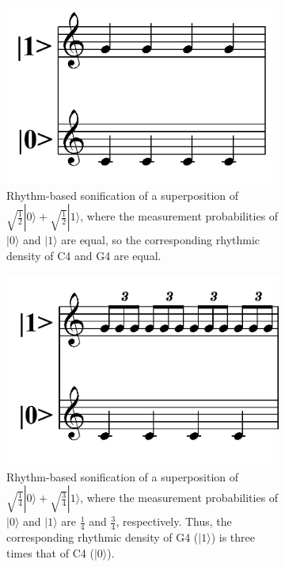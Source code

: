 \documentclass[10pt,twocolumn]{article}
\begin{document}
\begin{figure}[h]

        \begin{subfigure}{0.45\textwidth}
                \centering
                \includegraphics[width=\textwidth]{fig/Figure 1a.png} %
                \caption{Rhythm-based sonification of a superposition of $\sqrt{\frac{1}{2}}|0\rangle + \sqrt{\frac{1}{2}}|1\rangle$, where the measurement probabilities of $|0\rangle$ and $|1\rangle$ are equal, so the corresponding rhythmic density of C4 and G4 are equal.}
                \label{fig:Figure1a}
        \end{subfigure}

        \hfill

        \begin{subfigure}{0.45\textwidth}
                \centering
                \includegraphics[width=\textwidth]{fig/Figure 1b.png} %
                \caption{Rhythm-based sonification of a superposition of $\sqrt{\frac{1}{4}}|0\rangle + \sqrt{\frac{3}{4}}|1\rangle$, where the measurement probabilities of $|0\rangle$ and $|1\rangle$ are $\frac{1}{4}$ and $\frac{3}{4}$, respectively. Thus, the corresponding rhythmic density of G4 ($|1\rangle$) is three times that of C4 ($|0\rangle$).}
                \label{fig:Figure1b}
        \end{subfigure}

        \caption{}
        \label{fig:Figure1}

\end{figure}
\end{document}
